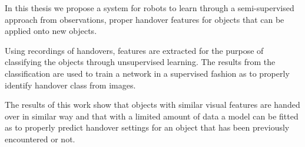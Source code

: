 In this thesis we propose a system for robots to learn through a semi-supervised approach from observations, proper handover features for objects that can be applied onto new objects.

Using recordings of handovers, features are extracted for the purpose of classifying the objects through unsupervised learning. The results from the classification are used to train a network in a supervised fashion as to properly identify handover class from images.

The results of this work show that objects with similar visual features are handed over in similar way and that with a limited amount of data a model can be fitted as to properly predict handover settings for an object that has been previously encountered or not.
